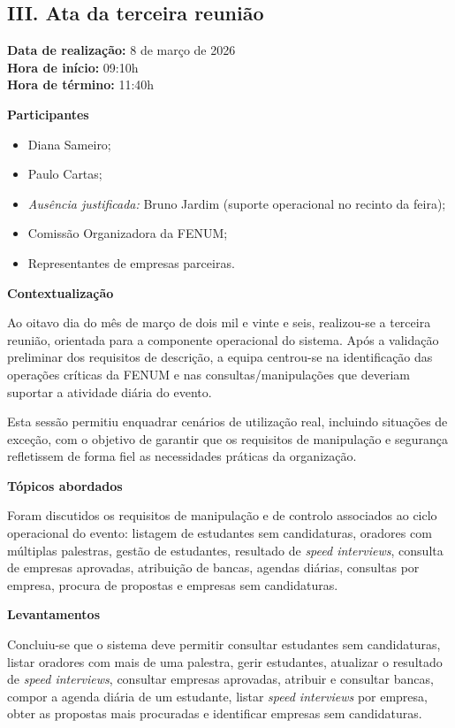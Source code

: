 \documentclass[12pt,a4paper]{article}
\begin{document}
\newpage
{}
\subsection*{III. Ata da terceira reunião}

\textbf{Data de realização:} 8 de março de 2026 \\
\textbf{Hora de início:} 09:10h \\
\textbf{Hora de término:} 11:40h

\textbf{Participantes}
\begin{itemize}[leftmargin=1.5cm]
    \item Diana Sameiro;
    \item Paulo Cartas;
    \item \textit{Ausência justificada:} Bruno Jardim (suporte operacional no recinto da feira);
    \item Comissão Organizadora da FENUM;
    \item Representantes de empresas parceiras.
\end{itemize}

\textbf{Contextualização}

Ao oitavo dia do mês de março de dois mil e vinte e seis, realizou-se a terceira
reunião, orientada para a componente operacional do sistema. Após a validação
preliminar dos requisitos de descrição, a equipa centrou-se na identificação das
operações críticas da FENUM e nas consultas/manipulações que deveriam suportar a
atividade diária do evento.

Esta sessão permitiu enquadrar cenários de utilização real, incluindo situações
de exceção, com o objetivo de garantir que os requisitos de manipulação e
segurança refletissem de forma fiel as necessidades práticas da organização.

\textbf{Tópicos abordados}

Foram discutidos os requisitos de manipulação e de controlo associados ao ciclo
operacional do evento: listagem de estudantes sem candidaturas, oradores com
múltiplas palestras, gestão de estudantes, resultado de \textit{speed
interviews}, consulta de empresas aprovadas, atribuição de bancas, agendas
diárias, consultas por empresa, procura de propostas e empresas sem
candidaturas.

\textbf{Levantamentos}

Concluiu-se que o sistema deve permitir consultar estudantes sem candidaturas,
listar oradores com mais de uma palestra, gerir estudantes, atualizar o
resultado de \textit{speed interviews}, consultar empresas aprovadas, atribuir e
consultar bancas, compor a agenda diária de um estudante, listar \textit{speed
interviews} por empresa, obter as propostas mais procuradas e identificar
empresas sem candidaturas.
\end{document}
